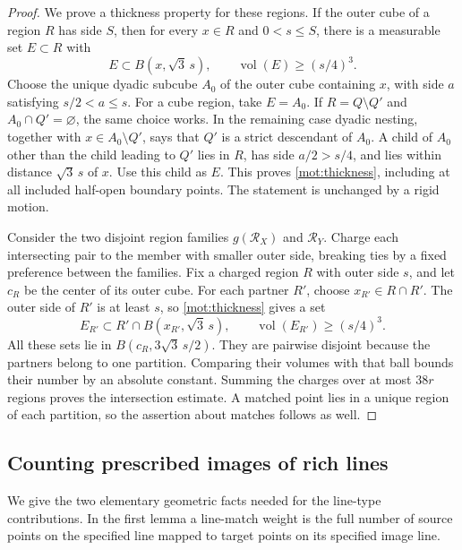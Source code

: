 \begin{proof}
We prove a thickness property for these regions.  If the outer
cube of a region \(R\) has side \(S\), then for every \(x\in R\)
and \(0<s\le S\), there is a measurable set \(E\subset R\) with
\begin{equation}
\label{mot:thickness}
 E\subset B(x,\sqrt3\,s),\qquad
 \operatorname{vol}(E)\ge(s/4)^3.
\end{equation}
Choose the unique dyadic subcube \(A_0\) of the outer cube
containing \(x\), with side \(a\) satisfying \(s/2<a\le s\).
For a cube region, take \(E=A_0\).  If
\(R=Q\setminus Q'\) and \(A_0\cap Q'=\varnothing\), the same
choice works.  In the remaining case dyadic nesting, together with
\(x\in A_0\setminus Q'\), says that \(Q'\) is a strict
descendant of \(A_0\).  A child of \(A_0\) other than the child
leading to \(Q'\) lies in \(R\), has side \(a/2>s/4\), and
lies within distance \(\sqrt3\,s\) of \(x\).  Use this child
as \(E\).  This proves \eqref{mot:thickness}, including at all
included half-open boundary points.  The statement is unchanged
by a rigid motion.

Consider the two disjoint region families
\(g(\mathcal R_X)\) and \(\mathcal R_Y\).  Charge each
intersecting pair to the member with smaller outer side, breaking
ties by a fixed preference between the families.  Fix a charged
region \(R\) with outer side \(s\), and let \(c_R\) be the
center of its outer cube.  For each partner \(R'\), choose
\(x_{R'}\in R\cap R'\).  The outer side of \(R'\) is at least
\(s\), so \eqref{mot:thickness} gives a set
\[
 E_{R'}\subset R'\cap B(x_{R'},\sqrt3\,s),\qquad
 \operatorname{vol}(E_{R'})\ge(s/4)^3.
\]
All these sets lie in \(B(c_R,3\sqrt3\,s/2)\).  They are
pairwise disjoint because the partners belong to one partition.
Comparing their volumes with that ball bounds their number by an
absolute constant.  Summing the charges over at most \(38r\)
regions proves the intersection estimate.  A matched point lies in
a unique region of each partition, so the assertion about matches
follows as well.
\end{proof}


\FloatBarrier

\subsection{Counting prescribed images of rich lines}

We give the two elementary geometric facts needed for the line-type
contributions.  In the first lemma a line-match weight is the full
number of source points on the specified line mapped to target
points on its specified image line.

